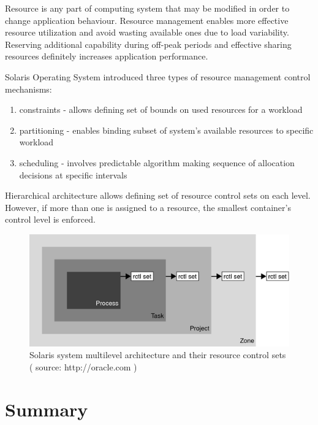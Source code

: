 \documentclass[11pt]{book}
\begin{document}
      Resource is any part of computing system that may be modified in order to change application behaviour. Resource
      management enables more effective resource utilization and avoid wasting available ones due to load variability.
      Reserving additional capability during off-peak periods and effective sharing resources definitely increases
      application performance.
      
      Solaris Operating System introduced three types of resource management control mechanisms:

      \begin{enumerate}
        \item{constraints - allows defining set of bounds on used resources for a workload}
        \item{partitioning - enables binding subset of system's available resources to specific workload}
        \item{scheduling - involves predictable algorithm making sequence of allocation decisions at specific intervals}
      \end{enumerate}

      Hierarchical architecture allows defining set of resource control sets on each level. However, if more
      than one is assigned to a resource, the smallest container's control level is enforced. 

      \begin{figure}[H]
        \includegraphics[width=\textwidth]{img/rctrl.png}
        \caption{Solaris system multilevel architecture and their resource control sets ( source: http://oracle.com ) }
		  \end{figure}
                

    \section*{Summary}
\end{document}
